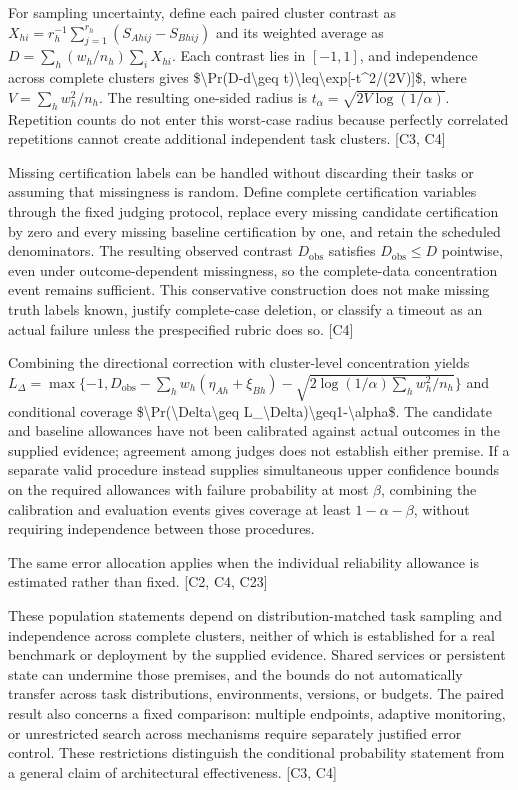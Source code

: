 \documentclass[11pt]{article}
\begin{document}
For sampling uncertainty, define each paired cluster contrast as $X_{hi}=r_h^{-1}\sum_{j=1}^{r_h}(S_{Ahij}-S_{Bhij})$ and its weighted average as $D=\sum_h(w_h/n_h)\sum_iX_{hi}$. Each contrast lies in $[-1,1]$, and independence across complete clusters gives \$\textbackslash{}Pr(D-d\textbackslash{}geq t)\textbackslash{}leq\textbackslash{}exp[-t\textasciicircum{}2/(2V)]\$, where $V=\sum_h w_h^2/n_h$. The resulting one-sided radius is $t_\alpha=\sqrt{2V\log(1/\alpha)}$. Repetition counts do not enter this worst-case radius because perfectly correlated repetitions cannot create additional independent task clusters. [C3, C4]

Missing certification labels can be handled without discarding their tasks or assuming that missingness is random. Define complete certification variables through the fixed judging protocol, replace every missing candidate certification by zero and every missing baseline certification by one, and retain the scheduled denominators. The resulting observed contrast $D_{\mathrm{obs}}$ satisfies $D_{\mathrm{obs}}\leq D$ pointwise, even under outcome-dependent missingness, so the complete-data concentration event remains sufficient. This conservative construction does not make missing truth labels known, justify complete-case deletion, or classify a timeout as an actual failure unless the prespecified rubric does so. [C4]

Combining the directional correction with cluster-level concentration yields $L_\Delta=\max\{-1,D_{\mathrm{obs}}-\sum_h w_h(\eta_{Ah}+\xi_{Bh})-\sqrt{2\log(1/\alpha)\sum_h w_h^2/n_h}\}$ and conditional coverage \$\textbackslash{}Pr(\textbackslash{}Delta\textbackslash{}geq L\_\textbackslash{}Delta)\textbackslash{}geq1-\textbackslash{}alpha\$. The candidate and baseline allowances have not been calibrated against actual outcomes in the supplied evidence; agreement among judges does not establish either premise. If a separate valid procedure instead supplies simultaneous upper confidence bounds on the required allowances with failure probability at most $\beta$, combining the calibration and evaluation events gives coverage at least $1-\alpha-\beta$, without requiring independence between those procedures.

The same error allocation applies when the individual reliability allowance is estimated rather than fixed. [C2, C4, C23]

These population statements depend on distribution-matched task sampling and independence across complete clusters, neither of which is established for a real benchmark or deployment by the supplied evidence. Shared services or persistent state can undermine those premises, and the bounds do not automatically transfer across task distributions, environments, versions, or budgets. The paired result also concerns a fixed comparison: multiple endpoints, adaptive monitoring, or unrestricted search across mechanisms require separately justified error control. These restrictions distinguish the conditional probability statement from a general claim of architectural effectiveness. [C3, C4]
\end{document}

